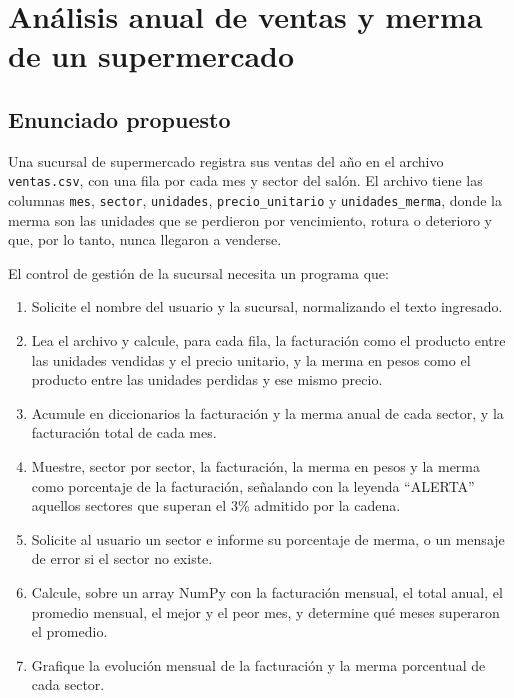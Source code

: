 \documentclass[12pt]{article}
\begin{document}

\newpage
\section{Análisis anual de ventas y merma de un supermercado}

\subsection*{Enunciado propuesto}

Una sucursal de supermercado registra sus ventas del año en el archivo \texttt{ventas.csv}, con una fila por cada mes y sector del salón. El archivo tiene las columnas \texttt{mes}, \texttt{sector}, \texttt{unidades}, \texttt{precio\_unitario} y \texttt{unidades\_merma}, donde la merma son las unidades que se perdieron por vencimiento, rotura o deterioro y que, por lo tanto, nunca llegaron a venderse.

El control de gestión de la sucursal necesita un programa que:

\begin{enumerate}[label=\alph*)]
    \item Solicite el nombre del usuario y la sucursal, normalizando el texto ingresado.
    \item Lea el archivo y calcule, para cada fila, la facturación como el producto entre las unidades vendidas y el precio unitario, y la merma en pesos como el producto entre las unidades perdidas y ese mismo precio.
    \item Acumule en diccionarios la facturación y la merma anual de cada sector, y la facturación total de cada mes.
    \item Muestre, sector por sector, la facturación, la merma en pesos y la merma como porcentaje de la facturación, señalando con la leyenda \enquote{ALERTA} aquellos sectores que superan el 3\% admitido por la cadena.
    \item Solicite al usuario un sector e informe su porcentaje de merma, o un mensaje de error si el sector no existe.
    \item Calcule, sobre un array NumPy con la facturación mensual, el total anual, el promedio mensual, el mejor y el peor mes, y determine qué meses superaron el promedio.
    \item Grafique la evolución mensual de la facturación y la merma porcentual de cada sector.
\end{enumerate}
\end{document}
